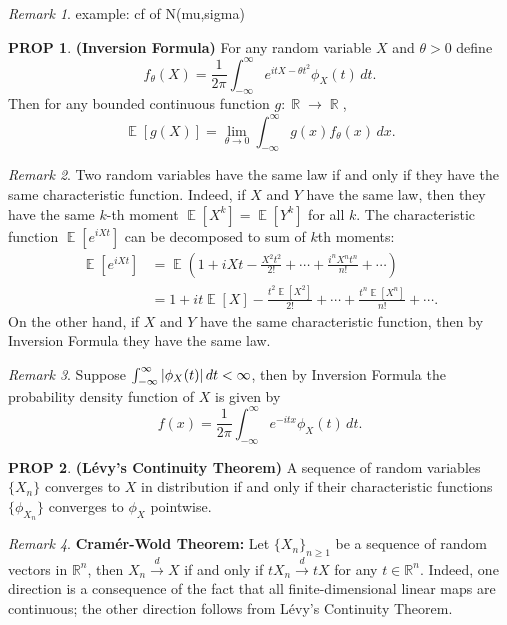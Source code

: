 \documentclass[hidelinks,11pt]{article}
\theoremstyle{definition}
\theoremstyle{dotless}
\newtheorem{prop}{PROP}[section]
\theoremstyle{remark}
\newtheorem*{remark}{Remark}
\DeclareMathOperator{\E}{\mathbb{E}}
\DeclareMathOperator{\R}{\mathbb{R}}
\DeclareMathOperator{\1}{\mathbf{1}}
\begin{document}
\begin{remark}
example: cf of N(mu,sigma)
\end{remark}

\begin{prop}\textup{\textbf{(Inversion Formula)}} For any random variable $X$ and $\theta>0$ define
\[f_\theta(X)=\frac{1}{2\pi}\int_{-\infty}^\infty e^{itX-\theta t^2}\phi_X(t)\,dt.\]
Then for any bounded continuous function $g:\R\to\R$,
\[\E[g(X)]=\lim_{\theta\to0}\int_{-\infty}^\infty g(x)f_\theta(x)\,dx.\]
\end{prop}

\begin{remark}
Two random variables have the same law if and only if they have the same characteristic function. Indeed, if $X$ and $Y$ have the same law, then they have the same $k$-th moment $\E[X^k]=\E[Y^k]$ for all $k$. The characteristic function $\E[e^{iXt}]$ can be decomposed to sum of $k$th moments:
\begin{align*}
\E[e^{iXt}]&=\E(1+iXt-\frac{X^2t^2}{2!}+\cdots+\frac{i^nX^nt^n}{n!}+\cdots)\\&=1+it\E[X]-\frac{t^2\E[X^2]}{2!}+\cdots+\frac{t^n\E[X^n]}{n!}+\cdots.
\end{align*}
On the other hand, if $X$ and $Y$ have the same characteristic function, then by Inversion Formula they have the same law.
\end{remark}

\begin{remark}
Suppose $\int_{-\infty}^\infty\abs{\phi_X(t)}\,dt<\infty$, then by Inversion Formula the probability density function of $X$ is given by
\[f(x)=\frac{1}{2\pi}\int_{-\infty}^\infty e^{-itx}\phi_X(t)\,dt.\]
\end{remark}

\begin{prop}\textup{\textbf{(Lévy's Continuity Theorem)}} A sequence of random variables $\{X_n\}$ converges to $X$ in distribution if and only if their characteristic functions $\{\phi_{X_n}\}$ converges to $\phi_X$ pointwise.
\end{prop}

\begin{remark}
\textup{\textbf{Cramér-Wold Theorem:}} Let $\{X_n\}_{n\geq1}$ be a sequence of random vectors in $\mathbb{R}^n$, then $X_n\xrightarrow{d}X$ if and only if $tX_n\xrightarrow{d}tX$ for any $t\in\mathbb{R}^n$. Indeed, one direction is a consequence of the fact that all finite-dimensional linear maps are continuous; the other direction follows from Lévy's Continuity Theorem.
\end{remark}
\end{document}
